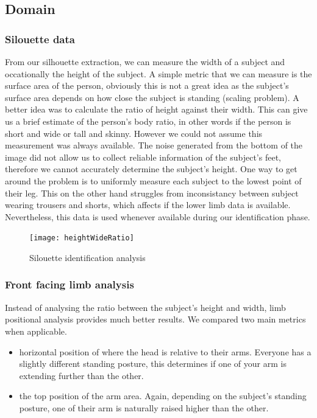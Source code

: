 \documentclass[10pt,journal,compsoc]{IEEEtran}
\begin{document}
\subsection{Domain}

\subsubsection{Silouette data}
From our silhouette extraction, we can measure the width of a subject and occationally the height of the subject. A simple metric that we can measure is the surface area of the person, obviously this is not a great idea as the subject's surface area depends on how close the subject is standing (scaling problem). A better idea was to calculate the ratio of height against their width. This can give us a brief estimate of the person's body ratio, in other words if the person is short and
wide or tall and skinny. However we could not assume this measurement was always available. The noise generated from the bottom of the image did not allow us to collect reliable information of the subject's feet, therefore we cannot accurately determine the subject's height. One way to get around the problem is to uniformly measure each subject to the lowest point of their leg. This on the other hand struggles from inconsistancy between subject wearing trousers and shorts, which affects if
the lower limb data is available. Nevertheless, this data is used whenever available during our identification phase.

\begin{figure}[!htb]
\centering
\texttt{[image: heightWideRatio]}
    \caption{Silouette identification analysis}
\end{figure}


\subsubsection{Front facing limb analysis}
Instead of analysing the ratio between the subject's height and width, limb positional analysis provides much better results. We compared two main metrics when applicable.

\begin{itemize}
    \item horizontal position of where the head is relative to their arms. Everyone has a slightly different standing posture, this determines if one of your arm is extending further than the other. 
    \item the top position of the arm area. Again, depending on the subject's standing posture, one of their arm is naturally raised higher than the other. \cite{Mittal2011}
\end{itemize}
\end{document}
